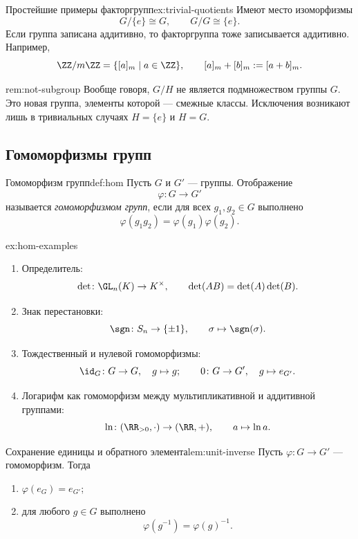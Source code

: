 \begin{Example}{Простейшие примеры факторгрупп}{ex:trivial-quotients}
	Имеют место изоморфизмы
	\[
	G/\{e\} \cong G, \qquad G/G \cong \{e\}.
	\]
	Если группа записана аддитивно, то факторгруппа тоже записывается аддитивно. Например,
	\[
	\ZZ/m\ZZ = \{[a]_m \mid a\in \ZZ\}, \qquad [a]_m + [b]_m := [a+b]_m.
	\]
\end{Example}

\begin{Remark}{}{rem:not-subgroup}
	Вообще говоря, $G/H$ не является подмножеством группы $G$. Это новая группа, элементы которой --- смежные классы. Исключения возникают лишь в тривиальных случаях $H=\{e\}$ и $H=G$.
\end{Remark}

\subsection{Гомоморфизмы групп}

\begin{Definition}{Гомоморфизм групп}{def:hom}
	Пусть $G$ и $G'$ --- группы. Отображение
	\[
	\varphi\colon G \to G'
	\]
	называется \emph{гомоморфизмом групп}, если для всех $g_1,g_2\in G$ выполнено
	\[
	\varphi(g_1g_2)=\varphi(g_1)\varphi(g_2).
	\]
\end{Definition}

\begin{Example}{}{ex:hom-examples}
	\begin{enumerate}
		\item Определитель:
		\[
		\det\colon \GL_n(K) \to K^{\times}, \qquad \det(AB)=\det(A)\det(B).
		\]
		\item Знак перестановки:
		\[
		\sgn\colon S_n \to \{\pm 1\}, \qquad \sigma \mapsto \sgn(\sigma).
		\]
		\item Тождественный и нулевой гомоморфизмы:
		\[
		\id_G\colon G\to G, \quad g\mapsto g;
		\qquad
		0\colon G\to G', \quad g\mapsto e_{G'}.
		\]
		\item Логарифм как гомоморфизм между мультипликативной и аддитивной группами:
		\[
		\ln\colon (\RR_{>0},\cdot) \to (\RR,+), \qquad a\mapsto \ln a.
		\]
	\end{enumerate}
\end{Example}

\begin{Lemma}{Сохранение единицы и обратного элемента}{lem:unit-inverse}
	Пусть $\varphi\colon G\to G'$ --- гомоморфизм. Тогда
	\begin{enumerate}
		\item $\varphi(e_G)=e_{G'}$;
		\item для любого $g\in G$ выполнено
		\[
		\varphi(g^{-1})=\varphi(g)^{-1}.
		\]
	\end{enumerate}
\end{Lemma}

